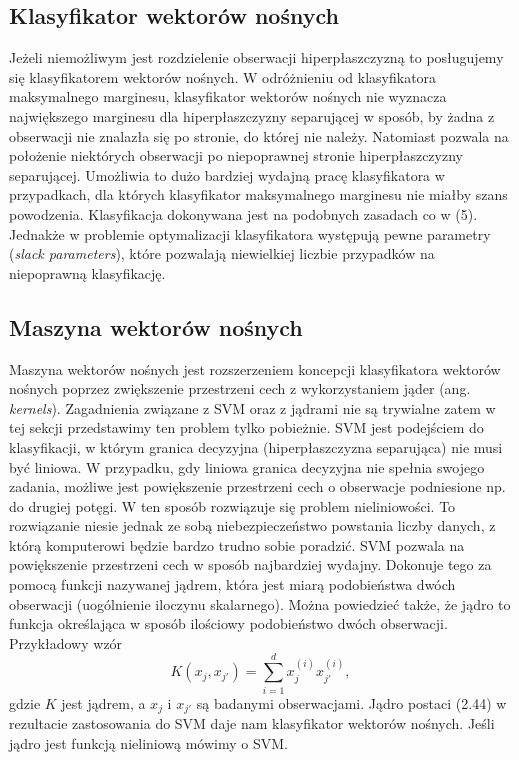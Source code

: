 \documentclass[a4paper]{article}
\begin{document}
\subsection{Klasyfikator wektorów nośnych}
Jeżeli niemożliwym jest rozdzielenie obserwacji hiperpłaszczyzną to posługujemy się klasyfikatorem wektorów nośnych. W odróżnieniu od klasyfikatora maksymalnego marginesu, klasyfikator wektorów nośnych nie wyznacza największego marginesu dla hiperpłaszczyzny separującej w sposób, by żadna z obserwacji nie znalazła się po stronie, do której nie należy. Natomiast pozwala na położenie niektórych obserwacji po niepoprawnej stronie hiperpłaszczyzny separującej. Umożliwia to dużo bardziej wydajną pracę klasyfikatora w przypadkach, dla których klasyfikator maksymalnego marginesu nie miałby szans powodzenia. Klasyfikacja dokonywana jest na podobnych zasadach co w (5). Jednakże w problemie optymalizacji klasyfikatora występują pewne parametry (\textit{slack parameters}), które pozwalają niewielkiej liczbie przypadków na niepoprawną klasyfikację. 
\subsection{Maszyna wektorów nośnych}
Maszyna wektorów nośnych jest rozszerzeniem koncepcji klasyfikatora wektorów nośnych poprzez zwiększenie przestrzeni cech z wykorzystaniem jąder (ang. \textit{kernels}). Zagadnienia związane z SVM oraz z jądrami nie są trywialne zatem w tej sekcji przedstawimy ten problem tylko pobieżnie. SVM jest podejściem do klasyfikacji, w którym granica decyzyjna (hiperpłaszczyzna separująca) nie musi być liniowa.  W przypadku, gdy liniowa granica decyzyjna nie spełnia swojego zadania, możliwe jest powiększenie przestrzeni cech o obserwacje podniesione np. do drugiej potęgi. W ten sposób rozwiązuje się problem nieliniowości. To rozwiązanie niesie jednak ze sobą niebezpieczeństwo powstania liczby danych, z którą komputerowi będzie bardzo trudno sobie poradzić. SVM pozwala na powiększenie przestrzeni cech w sposób najbardziej wydajny. Dokonuje tego za pomocą funkcji nazywanej jądrem, która jest miarą podobieństwa dwóch obserwacji (uogólnienie iloczynu skalarnego). Można powiedzieć także, że jądro to funkcja określająca w sposób ilościowy podobieństwo dwóch obserwacji. Przykładowy wzór
\begin{equation}\label{(2.44)}
    K(x_j, x_{j'}) = \sum\limits^d_{i=1}x_{j}^{(i)}x_{j'}^{(i)},
\end{equation} 
gdzie $K$ jest jądrem, a $x_j$ i $x_{j'}$ są badanymi obserwacjami. Jądro  postaci (2.44) w rezultacie zastosowania do SVM daje nam klasyfikator wektorów nośnych. Jeśli jądro jest funkcją nieliniową mówimy o SVM. 
\newpage
\end{document}
